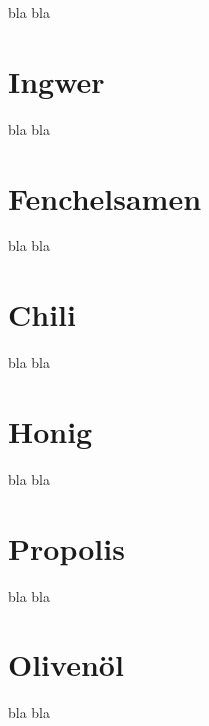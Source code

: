 bla bla

\section{Ingwer}

bla bla

\section{Fenchelsamen}

bla bla

\section{Chili}

bla bla

\section{Honig}

bla bla

\section{Propolis}

bla bla

\section{Olivenöl}

bla bla


